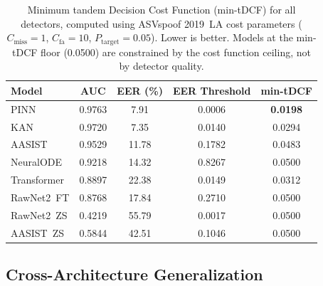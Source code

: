 \documentclass{article}
\begin{document}
\begin{table}[ht]
  \caption{Minimum tandem Decision Cost Function (min-tDCF) for all detectors,
  computed using ASVspoof 2019~LA cost parameters ($C_\mathrm{miss}=1$,
  $C_\mathrm{fa}=10$, $P_\mathrm{target}=0.05$). Lower is better.
  Models at the min-tDCF floor (0.0500) are constrained by the cost
  function ceiling, not by detector quality.}
  \label{fig:mintdcf}
  \centering
  \small
  \setlength{\tabcolsep}{6pt}
  \begin{tabular}{lcccc}
    \toprule
    Model & AUC & EER (\%) & EER Threshold & min-tDCF \\
    \midrule
    PINN        & 0.9763 &  7.91 & 0.0006 & \textbf{0.0198} \\
    KAN         & 0.9720 &  7.35 & 0.0140 & 0.0294 \\
    AASIST      & 0.9529 & 11.78 & 0.1782 & 0.0483 \\
    NeuralODE   & 0.9218 & 14.32 & 0.8267 & 0.0500 \\
    Transformer & 0.8897 & 22.38 & 0.0149 & 0.0312 \\
    RawNet2~FT  & 0.8768 & 17.84 & 0.2710 & 0.0500 \\
    RawNet2~ZS  & 0.4219 & 55.79 & 0.0017 & 0.0500 \\
    AASIST~ZS   & 0.5844 & 42.51 & 0.1046 & 0.0500 \\
    \bottomrule
  \end{tabular}
\end{table}

\subsection{Cross-Architecture Generalization}
\label{sec:generalization}
\end{document}
